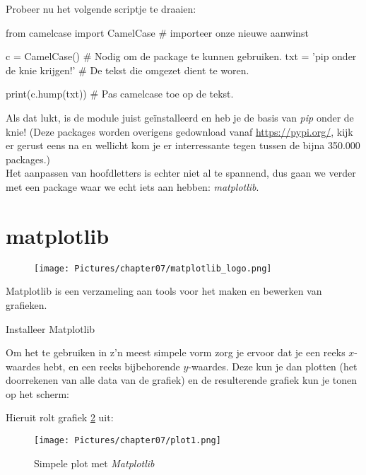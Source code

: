 Probeer nu het volgende scriptje te draaien:
\begin{python}
from camelcase import CamelCase     # importeer onze nieuwe aanwinst

c = CamelCase()                     # Nodig om de package te kunnen gebruiken.
txt = 'pip onder de knie krijgen!'  # De tekst die omgezet dient te woren.

print(c.hump(txt))                  # Pas camelcase toe op de tekst.
\end{python}
Als dat lukt, is de module juist geïnstalleerd en heb je de basis van \textit{pip} onder de knie! (Deze packages worden overigens gedownload vanaf \url{https://pypi.org/}, kijk er gerust eens na en wellicht kom je er interressante tegen tussen de bijna 350.000 packages.) \\
Het aanpassen van hoofdletters is echter niet al te spannend, dus gaan we verder met een package waar we echt iets aan hebben: \textit{matplotlib}. 

\newpage
\section{matplotlib}

\begin{figure}[h!]
\centering\texttt{[image: Pictures/chapter07/matplotlib\_logo.png]}
\label{fig:mpllogo} %
\end{figure}

Matplotlib is een verzameling aan tools voor het maken en bewerken van grafieken. 
\begin{exercise}
  Installeer Matplotlib
\end{exercise}

Om het te gebruiken in z'n meest simpele vorm zorg je ervoor dat je een reeks $x$-waardes hebt, en een reeks bijbehorende $y$-waardes. Deze kun je dan plotten (het doorrekenen van alle data van de grafiek) en de resulterende grafiek kun je tonen op het scherm:


Hieruit rolt grafiek \ref{fig:plot1} uit:
\begin{figure}[h!]
\centering\texttt{[image: Pictures/chapter07/plot1.png]}
\caption{Simpele plot met \textit{Matplotlib}}
\label{fig:plot1} %
\end{figure}

